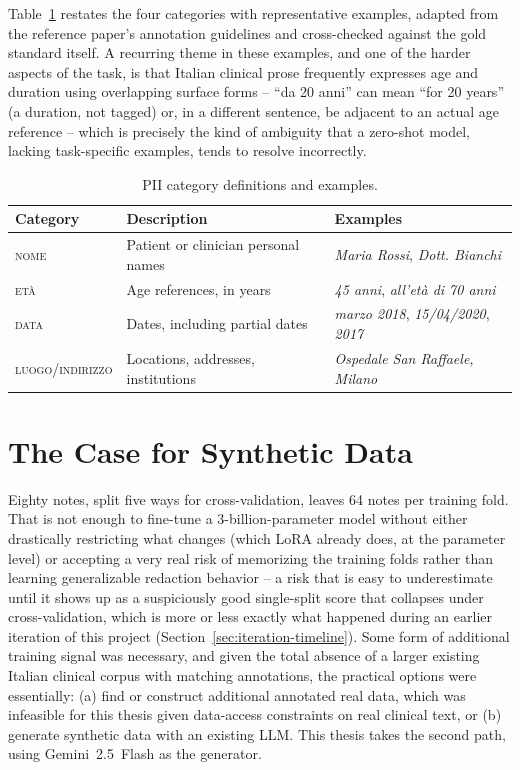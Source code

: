 \documentclass[12pt,a4paper]{report}
\newcommand{\NOME}{\textsc{nome}}
\newcommand{\ETA}{\textsc{et\`a}}
\newcommand{\DATA}{\textsc{data}}
\newcommand{\LUOGO}{\textsc{luogo\slash indirizzo}}
\begin{document}
Table~\ref{tab:category-examples} restates the four categories with representative examples, adapted from the reference paper's annotation guidelines and cross-checked against the gold standard itself. A recurring theme in these examples, and one of the harder aspects of the task, is that Italian clinical prose frequently expresses age and duration using overlapping surface forms -- ``da 20 anni'' can mean ``for 20 years'' (a duration, not tagged) or, in a different sentence, be adjacent to an actual age reference -- which is precisely the kind of ambiguity that a zero-shot model, lacking task-specific examples, tends to resolve incorrectly.

\begin{table}[htbp]
\centering
\caption{PII category definitions and examples.}
\label{tab:category-examples}
\begin{tabular}{p{2.6cm}p{5.2cm}p{5.6cm}}
\toprule
Category & Description & Examples \\
\midrule
\NOME{} & Patient or clinician personal names & \emph{Maria Rossi}, \emph{Dott. Bianchi} \\
\ETA{} & Age references, in years & \emph{45 anni}, \emph{all'et\`a di 70 anni} \\
\DATA{} & Dates, including partial dates & \emph{marzo 2018}, \emph{15/04/2020}, \emph{2017} \\
\LUOGO{} & Locations, addresses, institutions & \emph{Ospedale San Raffaele, Milano} \\
\bottomrule
\end{tabular}
\end{table}

\section{The Case for Synthetic Data}

Eighty notes, split five ways for cross-validation, leaves 64 notes per training fold. That is not enough to fine-tune a 3-billion-parameter model without either drastically restricting what changes (which LoRA already does, at the parameter level) or accepting a very real risk of memorizing the training folds rather than learning generalizable redaction behavior -- a risk that is easy to underestimate until it shows up as a suspiciously good single-split score that collapses under cross-validation, which is more or less exactly what happened during an earlier iteration of this project (Section~\ref{sec:iteration-timeline}). Some form of additional training signal was necessary, and given the total absence of a larger existing Italian clinical corpus with matching annotations, the practical options were essentially: (a) find or construct additional annotated real data, which was infeasible for this thesis given data-access constraints on real clinical text, or (b) generate synthetic data with an existing LLM. This thesis takes the second path, using Gemini~2.5~Flash as the generator.
\end{document}
